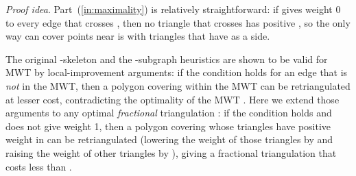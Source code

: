 \documentclass[final]{siamltex}
\newenvironment{proofidea}{\par{\it Proof idea}. \ignorespaces}{}
\begin{document}
\begin{proofidea}
  Part~(\ref{in:maximality}) is relatively straightforward:
  if  gives weight 0 to every edge that crosses ,
  then no triangle  that crosses  has positive , 
  so the only way  can cover points near  is with triangles that have  as a side.

  The original -skeleton and the -subgraph heuristics 
  are shown to be valid for MWT by local-improvement arguments:
  if the condition holds for an edge  that is {\em not} in the MWT,
 then a polygon  covering  within the MWT can be retriangulated at lesser cost,
  contradicting the optimality of the MWT
  \cite{keil1994computing,cheng1996approaching,yang1994chain,gilbert1979new}.
Here we extend those arguments to any optimal {\em fractional} triangulation :
  if the condition holds and  does not give  weight 1,
  then a polygon  covering  whose triangles have positive weight in 
  can be retriangulated (lowering the weight of those triangles by 
  and raising the weight of other triangles by ),
  giving a fractional triangulation that costs less than .


\end{proofidea}
\end{document}
